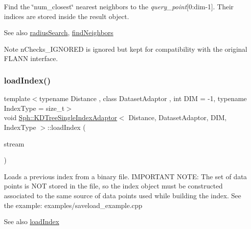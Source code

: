 Find the \char`\"{}num\+\_\+closest\char`\"{} nearest neighbors to the {\itshape query\+\_\+point}\mbox{[}0\+:dim-\/1\mbox{]}. Their indices are stored inside the result object. \begin{DoxySeeAlso}{See also}
\hyperlink{classSph_1_1KDTreeSingleIndexAdaptor_a1b00ad9bd5a4e2e265011ad4d2265e03}{radius\+Search}, \hyperlink{classSph_1_1KDTreeSingleIndexAdaptor_a444955d9248884e7fcb1fb238c3b0105}{find\+Neighbors} 
\end{DoxySeeAlso}
\begin{DoxyNote}{Note}
n\+Checks\+\_\+\+I\+G\+N\+O\+R\+ED is ignored but kept for compatibility with the original F\+L\+A\+NN interface. 
\end{DoxyNote}
\hypertarget{classSph_1_1KDTreeSingleIndexAdaptor_a0509f8a856bb3c6d278a182c5e6ce654}{}\label{classSph_1_1KDTreeSingleIndexAdaptor_a0509f8a856bb3c6d278a182c5e6ce654} 
\subsubsection{\texorpdfstring{load\+Index()}{loadIndex()}}
{\footnotesize\ttfamily template$<$typename Distance , class Dataset\+Adaptor , int D\+IM = -\/1, typename Index\+Type  = size\+\_\+t$>$ \\
void \hyperlink{classSph_1_1KDTreeSingleIndexAdaptor}{Sph\+::\+K\+D\+Tree\+Single\+Index\+Adaptor}$<$ Distance, Dataset\+Adaptor, D\+IM, Index\+Type $>$\+::load\+Index (\begin{DoxyParamCaption}\item[{F\+I\+LE $\ast$}]{stream }\end{DoxyParamCaption})\hspace{0.3cm}{\ttfamily [inline]}}

Loads a previous index from a binary file. I\+M\+P\+O\+R\+T\+A\+NT N\+O\+TE\+: The set of data points is N\+OT stored in the file, so the index object must be constructed associated to the same source of data points used while building the index. See the example\+: examples/saveload\+\_\+example.\+cpp \begin{DoxySeeAlso}{See also}
\hyperlink{classSph_1_1KDTreeSingleIndexAdaptor_a0509f8a856bb3c6d278a182c5e6ce654}{load\+Index} 
\end{DoxySeeAlso}
\hypertarget{classSph_1_1KDTreeSingleIndexAdaptor_a1b00ad9bd5a4e2e265011ad4d2265e03}{}\label{classSph_1_1KDTreeSingleIndexAdaptor_a1b00ad9bd5a4e2e265011ad4d2265e03} 
